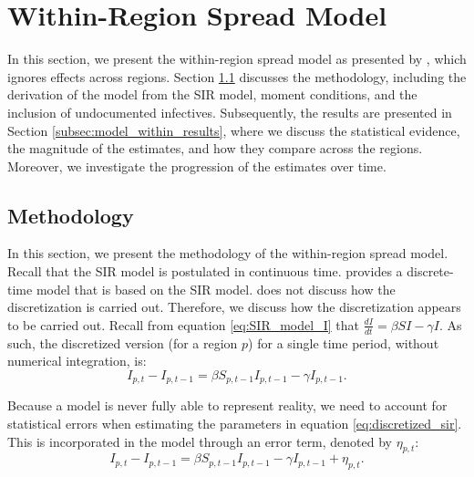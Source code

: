 \documentclass[12pt]{article}
\begin{document}
	\section{Within-Region Spread Model} \label{sec:model_within}
	In this section, we present the within-region spread model as presented by \textcite{adda2016economic}, which ignores effects across regions. Section \ref{subsec:model_within_methodology} discusses the methodology, including the derivation of the model from the SIR model, moment conditions, and the inclusion of undocumented infectives. Subsequently, the results are presented in Section \ref{subsec:model_within_results}, where we discuss the statistical evidence, the magnitude of the estimates, and how they compare across the regions. Moreover, we investigate the progression of the estimates over time.
	
	\subsection{Methodology} \label{subsec:model_within_methodology}
	In this section, we present the methodology of the within-region spread model. Recall that the SIR model is postulated in continuous time. \textcite{adda2016economic} provides a discrete-time model that is based on the SIR model. \textcite{adda2016economic} does not discuss how the discretization is carried out. Therefore, we discuss how the discretization appears to be carried out. Recall from equation \eqref{eq:SIR_model_I} that $\frac{dI}{dt} = \beta SI - \gamma I$. As such, the discretized version (for a region $p$) for a single time period, without numerical integration, is:
	    \begin{equation}\label{eq:discretized_sir}
	        I_{p,t} - I_{p,t-1} = \beta S_{p,t-1}I_{p,t-1} - \gamma I_{p,t-1}.
	    \end{equation}
	   
	Because a model is never fully able to represent reality, we need to account for statistical errors when estimating the parameters in equation \eqref{eq:discretized_sir}. This is incorporated in the model through an error term, denoted by $\eta_{p,t}$:
	    \begin{equation}\label{eq:discretized_sir_error}
	        I_{p,t} - I_{p,t-1} = \beta S_{p,t-1}I_{p,t-1} - \gamma I_{p,t-1} + \eta_{p,t}.
	    \end{equation}
	
\end{document}
